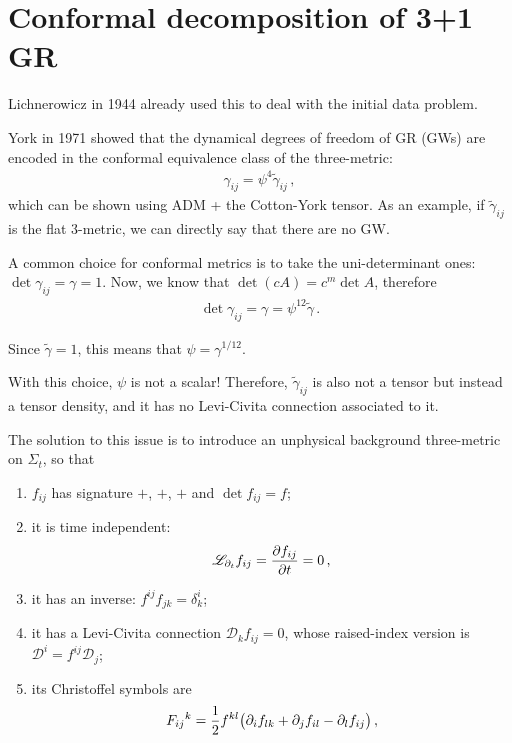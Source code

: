 \documentclass[main.tex]{subfiles}
\begin{document}
\section{Conformal decomposition of 3+1 GR}


Lichnerowicz in 1944 already used this to deal with the initial data problem. 

York in 1971 showed that the dynamical degrees of freedom of GR (GWs) are encoded in the conformal equivalence class of the three-metric: 
%
\begin{align}
\gamma_{ij} = \psi^{4} \widetilde{\gamma}_{ij}
\,,
\end{align}
%
which can be shown using ADM + the Cotton-York tensor. 
As an example, if \(\widetilde{\gamma}_{ij}\) is the flat 3-metric, we can directly say that there are no GW.

A common choice for conformal metrics is to take the uni-determinant ones: \(\det \gamma_{ij} = \gamma = 1\). 
Now, we know that \(\det (cA) = c^{m} \det A\), therefore 
%
\begin{align}
\det \gamma_{ij} = \gamma = \psi^{12} \widetilde{\gamma}
\,.
\end{align}

Since \(\widetilde{\gamma} = 1\), this means that \(\psi = \gamma^{1/12}\).

With this choice, \(\psi \) is not a scalar! 
Therefore, \(\widetilde{\gamma}_{ij}\) is also not a tensor but instead a tensor density, and it has no Levi-Civita connection associated to it. 

The solution to this issue is to introduce an unphysical background three-metric on \(\Sigma_{t}\), so that 
\begin{enumerate}
    \item \(f_{ij}\) has signature \(+\), \(+\), \(+\) and \(\det f_{ij} = f\);
    \item it is time independent: 
    \begin{align}
    \mathscr{L}_{\partial_{t}} f_{ij} = \pdv{f_{ij}}{t} = 0
    \,,
    \end{align}
    \item it has an inverse: \(f^{ij}f_{jk} = \delta^{i}_{k}\);
    \item it has a Levi-Civita connection \(\mathcal{D}_k f_{ij} = 0\), whose raised-index version is \(\mathcal{D}^{i} = f^{ij} \mathcal{D}_{j}\);
    \item its Christoffel symbols are 
    \begin{align}
    F_{ij}{}^{k} = \frac{1}{2} f^{kl} \qty(\partial_{i} f_{lk} +\partial_{j} f_{il} - \partial_{l} f_{ij})
    \,,
    \end{align}
\end{enumerate}
\end{document}
